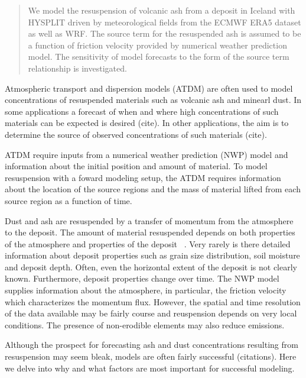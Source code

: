 


\begin{abstract}
We model the resuspension of volcanic ash from a deposit in Iceland with HYSPLIT driven by meteorological
fields from the ECMWF ERA5 dataset as well as WRF. The source term for the resuspended ash is assumed to be
a function of friction velocity provided by numerical weather prediction model. 
The sensitivity of model forecasts to the form of the source term relationship is investigated.

\end{abstract}


\introduction  %

Atmospheric transport and dispersion models (ATDM) are often used to model concentrations
of resuspended materials such as volcanic ash and minearl dust. In some applications a forecast of when and where
high concentrations of such materials can be expected is desired (cite). In other applications, the aim
is to determine the source of observed concentrations of such materials (cite).

ATDM require inputs from a numerical weather prediction (NWP) model and
information about the initial position and amount of material. To model resuspension with a foward modeling setup, the ATDM
requires information about the location of the source regions and the mass of material lifted from each source
region as a function of time. 

Dust and ash are resuspended
by a transfer of momentum from the atmosphere to the deposit. The amount of material resuspended
depends on both properties of the atmosphere and properties of the deposit ~\citep{Kok12}. 
Very rarely is there detailed information about deposit properties such as grain size distribution, soil moisture and deposit depth.
Often, even the horizontal extent of the deposit is not clearly known. 
Furthermore, deposit properties change over time. 
The NWP model supplies information about the atmosphere, in particular, the friction velocity which characterizes
the momentum flux. However, the spatial and time resolution of the data available may be fairly course and
reuspension depends on very local conditions. The presence of non-erodible elements may also reduce emissions.

Although the prospect for forecasting ash and dust concentrations resulting from resuspension may seem bleak, models are often
fairly successful (citations). Here we delve into why and what factors are most important for successful modeling.

